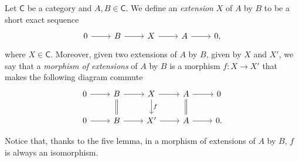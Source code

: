 \documentclass[../Main]{subfiles}
\begin{document}
\begin{defn}[Extension]
	Let $\mathsf{C}$ be a category and $A,B \in \mathsf{C}$.
	We define an {\em extension} $X$ of $A$ by $B$ to be a short exact sequence
	\begin{equation*}
	\begin{tikzcd}
		0 \arrow[r, "", rightarrow] &
		B \arrow[r, "", rightarrow] &
		X \arrow[r, "", rightarrow] &
		A \arrow[r, "", rightarrow] &
		0
	,\end{tikzcd}
	\end{equation*}
	where $X \in \mathsf{C}$.
	Moreover, given two extensions of $A$ by $B$, given by $X$ and $X'$,
	we say that a {\em morphism of extensions} of $A$ by $B$
	is a morphism $f\colon X \to X'$ that makes the following diagram commute
	\begin{equation*}
	\begin{tikzcd}
		0 \arrow[r, "", rightarrow] &
		B \arrow[r, "", rightarrow] 
		\arrow[d, "", equals] &
		X \arrow[r, "", rightarrow] 
		\arrow[d, "f", rightarrow] &
		A \arrow[r, "", rightarrow] 
		\arrow[d, "", equals] &
		0\\
		0 \arrow[r, "", rightarrow] &
		B \arrow[r, "", rightarrow] &
		X' \arrow[r, "", rightarrow] &
		A \arrow[r, "", rightarrow] &
		0
	.\end{tikzcd}
	\end{equation*}
\end{defn}


\begin{rem}[]
	Notice that, thanks to the five lemma, in a morphism
	of extensions of $A$ by $B$, $f$ is always an isomorphism.
\end{rem}
\end{document}
